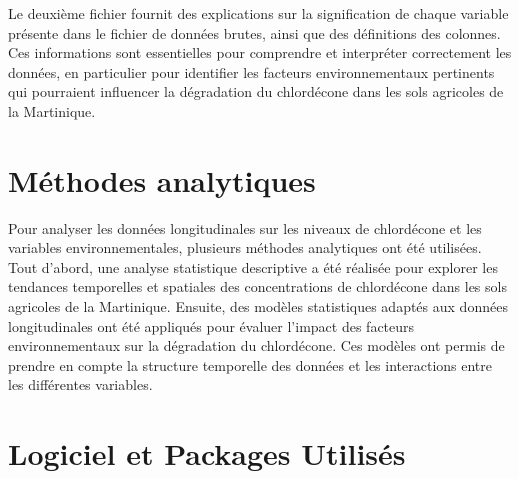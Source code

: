 \documentclass{report}
\begin{document}
Le deuxième fichier fournit des explications sur la signification de chaque variable présente dans le fichier de données brutes, ainsi que des définitions des colonnes. Ces informations sont essentielles pour comprendre et interpréter correctement les données, en particulier pour identifier les facteurs environnementaux pertinents qui pourraient influencer la dégradation du chlordécone dans les sols agricoles de la Martinique.\\
 

\section*{Méthodes analytiques}


Pour analyser les données longitudinales sur les niveaux de chlordécone et les variables environnementales, plusieurs méthodes analytiques ont été utilisées. Tout d'abord, une analyse statistique descriptive a été réalisée pour explorer les tendances temporelles et spatiales des concentrations de chlordécone dans les sols agricoles de la Martinique. Ensuite, des modèles statistiques adaptés aux données longitudinales ont été appliqués pour évaluer l'impact des facteurs environnementaux sur la dégradation du chlordécone. Ces modèles ont permis de prendre en compte la structure temporelle des données et les interactions entre les différentes variables.
\section*{Logiciel et Packages Utilisés}
\end{document}
